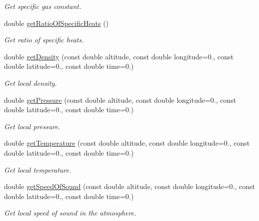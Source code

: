 \begin{DoxyCompactItemize}
\begin{DoxyCompactList}\small\item\em Get specific gas constant. \end{DoxyCompactList}\item 
double \hyperlink{classtudat_1_1aerodynamics_1_1ExponentialAtmosphere_a5e6fb84e94c8c020d2a8eee0c5212f7a}{get\+Ratio\+Of\+Specific\+Heats} ()
\begin{DoxyCompactList}\small\item\em Get ratio of specific heats. \end{DoxyCompactList}\item 
double \hyperlink{classtudat_1_1aerodynamics_1_1ExponentialAtmosphere_ac6bc5f5fee5475f805e34461fa77b29d}{get\+Density} (const double altitude, const double longitude=0., const double latitude=0., const double time=0.)
\begin{DoxyCompactList}\small\item\em Get local density. \end{DoxyCompactList}\item 
double \hyperlink{classtudat_1_1aerodynamics_1_1ExponentialAtmosphere_a5f9454b2cf717877723364ba3805e855}{get\+Pressure} (const double altitude, const double longitude=0., const double latitude=0., const double time=0.)
\begin{DoxyCompactList}\small\item\em Get local pressure. \end{DoxyCompactList}\item 
double \hyperlink{classtudat_1_1aerodynamics_1_1ExponentialAtmosphere_aa486d36c2fbe56026d7a4cc17f7d04a2}{get\+Temperature} (const double altitude, const double longitude=0., const double latitude=0., const double time=0.)
\begin{DoxyCompactList}\small\item\em Get local temperature. \end{DoxyCompactList}\item 
double \hyperlink{classtudat_1_1aerodynamics_1_1ExponentialAtmosphere_a90283cd42dc4ee31892750b82bedf14c}{get\+Speed\+Of\+Sound} (const double altitude, const double longitude=0., const double latitude=0., const double time=0.)
\begin{DoxyCompactList}\small\item\em Get local speed of sound in the atmosphere. \end{DoxyCompactList}\end{DoxyCompactItemize}


